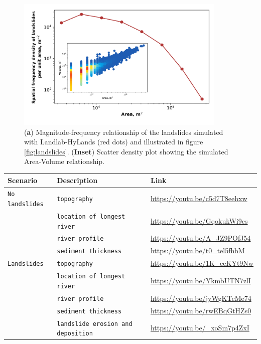 \documentclass[12pt]{amsart}
\begin{document}
\begin{figure}[t]
\includegraphics[width=10cm]{Figures/LS-Mag-Freq.png}
\caption{(\textbf{a}) Magnitude-frequency relationship of the landslides simulated with Landlab-HyLands (red dots) and illustrated in figure \ref{fig:landslides}. (\textbf{Inset}) Scatter density plot showing the simulated Area-Volume relationship.}
\label{fig:MF-landslides}
\end{figure}

\begin{table}[htbp]
    \Small
    \begin{tabular}{lll}
        \hline
        Scenario & Description & Link\\
        \hline\hline
        \verb|No landslides| &\verb|topography | & \url{https://youtu.be/c5d7T8eehxw} \\
        \verb|| &\verb|location of longest river|& \url{https://youtu.be/GqokukWi9cs} \\
        \verb|| &\verb|river profile |& \url{https://youtu.be/A_JZ9POfJ54} \\
        \verb|| &\verb|sediment thickness |& \url{https://youtu.be/t0_tel5fhbM} \\
        
        \verb|Landslides| &\verb|topography | & \url{https://youtu.be/1K_ceKYt9Nw} \\
        \verb|| &\verb|location of longest river|& \url{https://youtu.be/YkmbUTN7zlI} \\
        \verb|| &\verb|river profile |& \url{https://youtu.be/jyWgKTcMe74} \\
        \verb|| &\verb|sediment thickness |& \url{https://youtu.be/rwEBqGtHZs0} \\
        \verb|| &\verb|landslide erosion and deposition |& \url{https://youtu.be/_xoSm7p4ZxI} \\
    \hline
   \end{tabular}
   \label{tab:LS-movies}
\end{table} 
\end{document}
